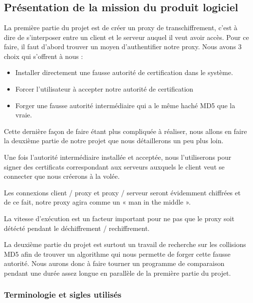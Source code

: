 \documentclass[a4paper,11pt,french]{article}
\begin{document}
\newpage
\section{}
\subsection{Présentation de la mission du produit logiciel}


La première partie du projet est de créer un proxy de transchiffrement, c'est à dire de s'interposer entre un client et le serveur auquel il veut avoir accès.
Pour ce faire, il faut d'abord trouver un moyen d'authentifier notre proxy.
Nous avons 3 choix qui s'offrent à nous :

\begin{itemize}
\item Installer directement une fausse autorité de certification dans le système.
\item Forcer l'utilisateur à accepter notre autorité de certification
\item Forger une fausse autorité intermédiaire qui a le même haché MD5 que la vraie.
\end{itemize}

Cette dernière façon de faire étant plus compliquée à réaliser, nous allons en faire la deuxième partie de notre projet que nous détaillerons un peu plus loin.

Une fois l'autorité intermédiaire installée et acceptée, nous l'utiliserons pour signer des certificats correspondant aux serveurs auxquels le client veut se connecter que nous créerons à la volée.

	Les connexions client / proxy et proxy / serveur seront évidemment chiffrées et de ce fait, notre proxy agira comme un « man in the middle ».

	La vitesse d'exécution est un facteur important pour ne pas que le proxy soit détécté pendant le déchiffrement / rechiffrement.

La deuxième partie du projet est surtout un travail de recherche sur les collisions MD5 afin de trouver un algorithme qui nous permette de forger cette fausse autorité. Nous aurons donc à faire tourner un programme de comparaison pendant une durée assez longue en parallèle de la première partie du projet.

\subsubsection{Terminologie et sigles utilisés}
\end{document}
